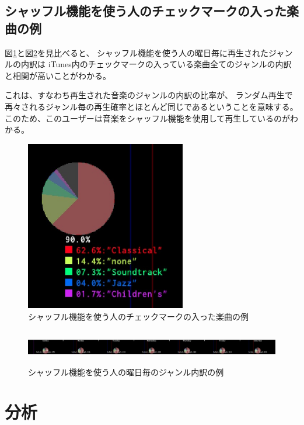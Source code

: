 \documentclass[11pt, onecolumn]{jsarticle}
\begin{document}
\subsection{シャッフル機能を使う人のチェックマークの入った楽曲の例}
図\ref{checkedItemsGenreMap_shuffle}と図\ref{weekGenreMap_shuffle}を見比べると、
シャッフル機能を使う人の曜日毎に再生されたジャンルの内訳は
iTunes内のチェックマークの入っている楽曲全てのジャンルの内訳と相関が高いことがわかる。

これは、すなわち再生された音楽のジャンルの内訳の比率が、
ランダム再生で再々されるジャンル毎の再生確率とほとんど同じであるということを意味する。
このため、このユーザーは音楽をシャッフル機能を使用して再生しているのがわかる。

\begin{figure}[h]
\begin{center}
\includegraphics[width=7cm]{taru_checkedItemGenreRatio.jpg}
\caption{シャッフル機能を使う人のチェックマークの入った楽曲の例}
\label{checkedItemsGenreMap_shuffle}
\end{center}
\end{figure}

\begin{figure}[h]
\begin{center}
\includegraphics[width=14cm, height = 1.5cm]{taru_weekGenreRatio.jpg}
\caption{シャッフル機能を使う人の曜日毎のジャンル内訳の例}
\label{weekGenreMap_shuffle}
\end{center}
\end{figure}



\section{分析}
\end{document}
